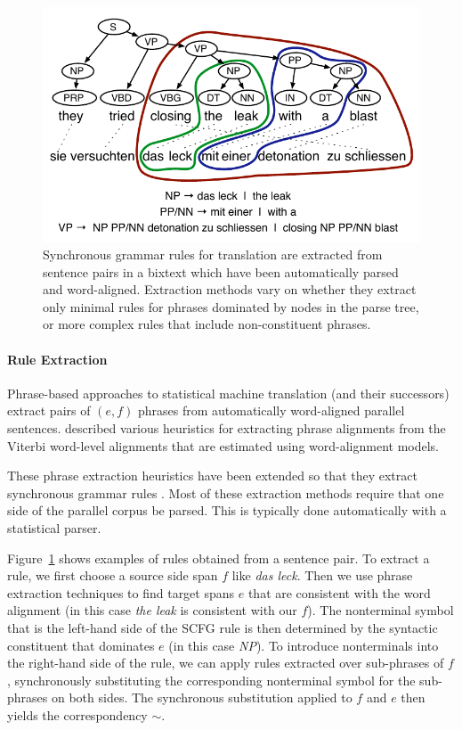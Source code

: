 \documentclass[11pt]{article}
\begin{document}
\begin{figure}[t]
\begin{center}
\includegraphics[width=0.9\linewidth]{figures/example_extraction-3.pdf}
\end{center}
\caption{Synchronous grammar rules for translation are extracted from
  sentence pairs in a bixtext which have been automatically parsed and
  word-aligned. Extraction methods vary on whether they extract only
  minimal rules for phrases dominated by nodes in the parse tree, or
  more complex rules that include non-constituent phrases.}
\label{example_extraction}
\end{figure}

\paragraph{Rule Extraction}

Phrase-based approaches to statistical machine translation (and their
successors) extract pairs of $(e, f)$ phrases from automatically
word-aligned parallel sentences. 
described various heuristics for extracting phrase alignments from the
Viterbi word-level alignments that are estimated using
 word-alignment models.

These phrase extraction heuristics have been extended so that they
extract synchronous grammar rules
\cite{Galley2004,Chiang2005,Zollmann2006,Liu2006}.  Most of these
extraction methods require that one side of the parallel corpus be
parsed. This is typically done automatically with a statistical
parser.

Figure~\ref{example_extraction} shows examples of rules obtained from
a sentence pair. To extract a rule, we first choose a source side span
$f$ like {\it das leck}.  Then we use phrase extraction techniques to
find target spans $e$ that are consistent with the word alignment (in
this case {\it the leak} is consistent with our $f$). The nonterminal
symbol that is the left-hand side of the SCFG rule is then determined
by the syntactic constituent that dominates $e$ (in this case {\it
  NP}). To introduce nonterminals into the right-hand side of the rule,
we can apply rules extracted over sub-phrases of $f$, synchronously
substituting the corresponding nonterminal symbol for the sub-phrases
on both sides. The synchronous substitution applied to $f$ and $e$
then yields the correspondency $\sim$.
\end{document}
